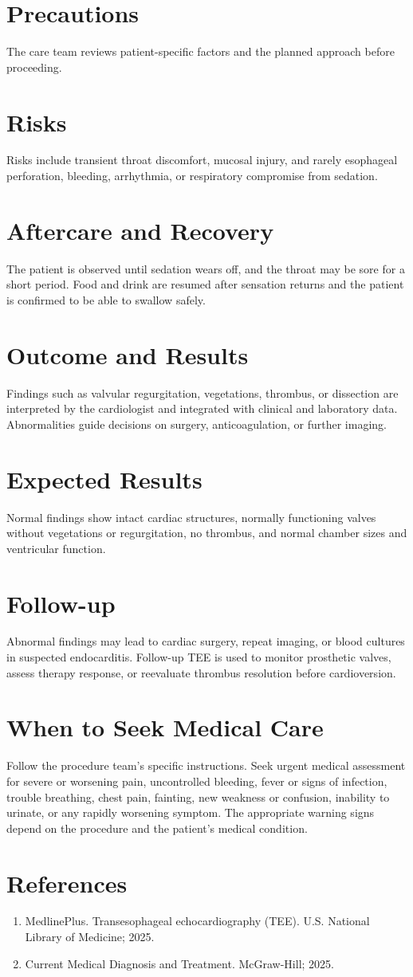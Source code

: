 \section*{Precautions}
The care team reviews patient-specific factors and the planned approach before proceeding.

\section*{Risks}
Risks include transient throat discomfort, mucosal injury, and rarely esophageal perforation, bleeding, arrhythmia, or respiratory compromise from sedation.

\section*{Aftercare and Recovery}
The patient is observed until sedation wears off, and the throat may be sore for a short period. Food and drink are resumed after sensation returns and the patient is confirmed to be able to swallow safely.

\section*{Outcome and Results}
Findings such as valvular regurgitation, vegetations, thrombus, or dissection are interpreted by the cardiologist and integrated with clinical and laboratory data. Abnormalities guide decisions on surgery, anticoagulation, or further imaging.

\section*{Expected Results}
Normal findings show intact cardiac structures, normally functioning valves without vegetations or regurgitation, no thrombus, and normal chamber sizes and ventricular function.

\section*{Follow-up}
Abnormal findings may lead to cardiac surgery, repeat imaging, or blood cultures in suspected endocarditis. Follow-up TEE is used to monitor prosthetic valves, assess therapy response, or reevaluate thrombus resolution before cardioversion.

\section*{When to Seek Medical Care}
Follow the procedure team's specific instructions. Seek urgent medical assessment for severe or worsening pain, uncontrolled bleeding, fever or signs of infection, trouble breathing, chest pain, fainting, new weakness or confusion, inability to urinate, or any rapidly worsening symptom. The appropriate warning signs depend on the procedure and the patient's medical condition.

\section*{References}
\begin{enumerate}
  \item MedlinePlus. Transesophageal echocardiography (TEE). U.S. National Library of Medicine; 2025.
  \item Current Medical Diagnosis and Treatment. McGraw-Hill; 2025.
\end{enumerate}

\clearpage
